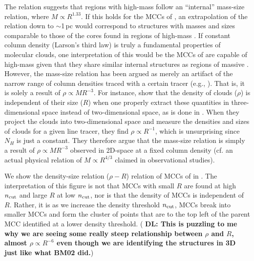 \IfFileExists{emulateapjlegacy.cls}{\documentclass[iop]{emulateapjlegacy}}{\documentclass[iop]{emulateapj}}
\newcommand{\DL}[1]{({\bf \color{dlcolor} DL: #1})}
\newcommand{\MM}[1]{({\bf \color{mmcolor} MM: #1})}
\begin{document}
The \citet{Kauffmann10c} relation suggests that regions with high-mass \SF follow 
an ``internal'' mass-size relation, where $M\propto R^{1.33}$.
If this holds for the MCCs of \flower, an extrapolation of the \citet{Kauffmann10c} relation down to $\sim$1\,pc would correspond 
to structures with masses and sizes comparable to those of the cores found in regions of high-mass \SF.
If constant column density (Larson's third law) is truly a fundamental properties of molecular clouds, 
one interpretation of this would be the MCCs of \flower are capable of high-mass \SF given that they share similar internal structures as 
regions of massive \SF. 
However, the mass-size relation has been argued as merely an artifact of the narrow range of column densities traced
with a certain tracer (e.g., \citealt{Ballesteros11}). 
That is, it is solely a result of $\rho\propto M R^{-3}$. 
For instance, \citet{Ballesteros02a} show that the density 
of clouds ($\rho$) is independent of their size ($R$) when one properly extract these quantities in three-dimensional space instead of 
two-dimensional space, as is done in \obs. 
When they project the clouds into two-dimensional space and measure the densities and sizes of clouds for a given 
line tracer, they find $\rho \propto R^{-1}$, which is unsurprising since $N_H$ is just a constant. 
They therefore argue that the mass-size relation is simply a result of $\rho\propto M R^{-3}$ 
observed in 2D-space at a fixed column density (cf. an actual physical relation of $M \propto R^{4/3}$ claimed in 
observational studies). %

We show the density-size relation ($\rho - R$) relation of MCCs of \flower in .
The interpretation of this figure is not that MCCs with small $R$ are found at high $n_{\rm cut}$ and large $R$ at low $n_{\rm cut}$, nor is that
the density of MCCs is independent of $R$. Rather, it is as we increase the density threshold $n_{\rm cut}$, MCCs break into smaller MCCs and 
form the cluster of points that are to the top left of the parent MCC identified at a lower density threshold.
\DL{This is puzzling to me why we are seeing some really steep relationship between $\rho$ and $R$, almost $\rho \propto R^{-6}$ 
even though we are identifying the structures in 3D just like what BM02 did.}
\end{document}
